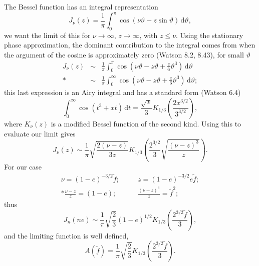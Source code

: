 \documentclass[aps,prd,reprint,showpacs,groupedaddress]{revtex4-1}
\newcommand{\dd}{\ensuremath{\mathrm{d}}}
\newcommand{\intd}[4]{\ensuremath{\int_{#1}^{#2}{#3}\,\dd{#4}}}
\newcommand{\recip}[1]{\ensuremath{\frac{1}{#1}}}
\begin{document}
The Bessel function has an integral representation
\begin{equation}
J_\nu(z) = \recip{\pi}\intd{0}{\pi}{\cos(\nu\vartheta - z\sin\vartheta)}{\vartheta},
\end{equation}
we want the limit of this for $\nu \rightarrow \infty$, $z \rightarrow \infty$, with $z \leq \nu$. Using the stationary phase approximation, the dominant contribution to the integral comes from when the argument of the cosine is approximately zero (Watson\cite{Watson1995} 8.2, 8.43), for small $\vartheta$
\begin{eqnarray}
J_\nu(z) & \sim & \recip{\pi}\intd{0}{\pi}{\cos\left(\nu\vartheta - z\vartheta + \frac{z}{6}\vartheta^3\right)}{\vartheta}\\*
 & \sim & \recip{\pi}\intd{0}{\infty}{\cos\left(\nu\vartheta - z\vartheta + \frac{z}{6}\vartheta^3\right)}{\vartheta};
\end{eqnarray}
this last expression is an Airy integral and has a standard form (Watson\cite{Watson1995} 6.4)
\begin{equation}
\intd{0}{\infty}{\cos(t^3 + xt)}{t} = \frac{\sqrt{x}}{3}K_{1/3}\left(\frac{2x^{3/2}}{3^{3/2}}\right),
\end{equation}
where $K_\nu(z)$ is a modified Bessel function of the second kind. Using this to evaluate our limit gives
\begin{equation}
J_\nu(z) \sim \recip{\pi}\sqrt{\frac{2(\nu - z)}{3z}}K_{1/3}\left(\frac{2^{3/2}}{3}\sqrt{\frac{(\nu -z)^3}{z}}\right).
\end{equation}
For our case
\begin{eqnarray}
\nu = (1 - e)^{-3/2}\tilde{f}; &\quad& z = (1 - e)^{-3/2}e\tilde{f}; \\*
\frac{\nu - z}{z} = (1 - e); &\quad& \frac{(\nu - z)^3}{z} = \tilde{f}^2;
\end{eqnarray}
thus
\begin{equation}
J_n(ne) \sim \recip{\pi}\sqrt{\frac{2}{3}}(1-e)^{1/2}K_{1/3}\left(\frac{2^{3/2}\tilde{f}}{3}\right),
\end{equation}
and the limiting function is well defined,
\begin{equation}
A(\tilde{f}) = \recip{\pi}\sqrt{\frac{2}{3}}K_{1/3}\left(\frac{2^{3/2}\tilde{f}}{3}\right).
\end{equation}
\end{document}
